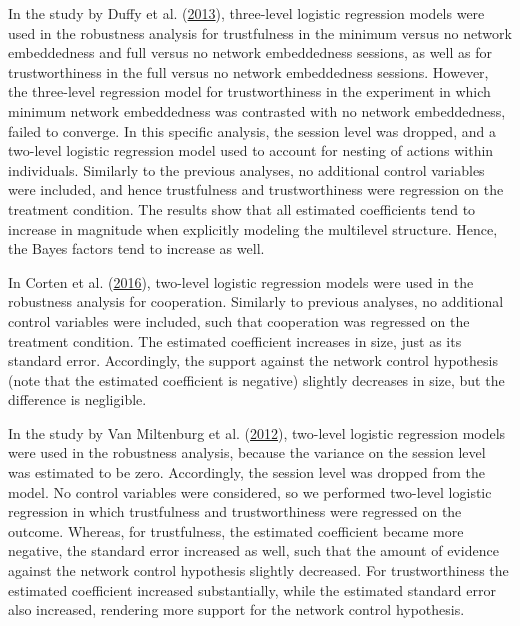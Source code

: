 \documentclass[
  11pt,
]{article}
\begin{document}
In the study by Duffy et al. (\protect\hyperlink{ref-duffy2013social}{2013}), three-level logistic regression models were used in the robustness analysis for trustfulness in the minimum versus no network embeddedness and full versus no network embeddedness sessions, as well as for trustworthiness in the full versus no network embeddedness sessions.
However, the three-level regression model for trustworthiness in the experiment in which minimum network embeddedness was contrasted with no network embeddedness, failed to converge.
In this specific analysis, the session level was dropped, and a two-level logistic regression model used to account for nesting of actions within individuals.
Similarly to the previous analyses, no additional control variables were included, and hence trustfulness and trustworthiness were regression on the treatment condition.
The results show that all estimated coefficients tend to increase in magnitude when explicitly modeling the multilevel structure.
Hence, the Bayes factors tend to increase as well.

In Corten et al. (\protect\hyperlink{ref-corten_etal_reputation_2016}{2016}), two-level logistic regression models were used in the robustness analysis for cooperation.
Similarly to previous analyses, no additional control variables were included, such that cooperation was regressed on the treatment condition.
The estimated coefficient increases in size, just as its standard error.
Accordingly, the support against the network control hypothesis (note that the estimated coefficient is negative) slightly decreases in size, but the difference is negligible.

In the study by Van Miltenburg et al. (\protect\hyperlink{ref-miltenburg_buskens_triads_2012}{2012}), two-level logistic regression models were used in the robustness analysis, because the variance on the session level was estimated to be zero.
Accordingly, the session level was dropped from the model.
No control variables were considered, so we performed two-level logistic regression in which trustfulness and trustworthiness were regressed on the outcome.
Whereas, for trustfulness, the estimated coefficient became more negative, the standard error increased as well, such that the amount of evidence against the network control hypothesis slightly decreased.
For trustworthiness the estimated coefficient increased substantially, while the estimated standard error also increased, rendering more support for the network control hypothesis.
\end{document}
